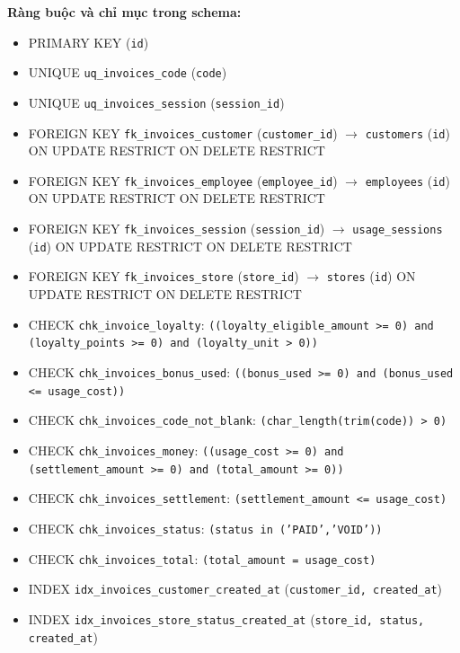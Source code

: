 \textbf{Ràng buộc và chỉ mục trong schema:}

\begin{itemize}

\item PRIMARY KEY (\texttt{id})

\item UNIQUE \texttt{uq\_invoices\_code} (\texttt{code})

\item UNIQUE \texttt{uq\_invoices\_session} (\texttt{session\_id})

\item FOREIGN KEY \texttt{fk\_invoices\_customer} (\texttt{customer\_id}) $\rightarrow$ \texttt{customers} (\texttt{id}) ON UPDATE RESTRICT ON DELETE RESTRICT

\item FOREIGN KEY \texttt{fk\_invoices\_employee} (\texttt{employee\_id}) $\rightarrow$ \texttt{employees} (\texttt{id}) ON UPDATE RESTRICT ON DELETE RESTRICT

\item FOREIGN KEY \texttt{fk\_invoices\_session} (\texttt{session\_id}) $\rightarrow$ \texttt{usage\_sessions} (\texttt{id}) ON UPDATE RESTRICT ON DELETE RESTRICT

\item FOREIGN KEY \texttt{fk\_invoices\_store} (\texttt{store\_id}) $\rightarrow$ \texttt{stores} (\texttt{id}) ON UPDATE RESTRICT ON DELETE RESTRICT

\item CHECK \texttt{chk\_invoice\_loyalty}: \texttt{((loyalty\_eligible\_amount >= 0) and (loyalty\_points >= 0) and (loyalty\_unit > 0))}

\item CHECK \texttt{chk\_invoices\_bonus\_used}: \texttt{((bonus\_used >= 0) and (bonus\_used <= usage\_cost))}

\item CHECK \texttt{chk\_invoices\_code\_not\_blank}: \texttt{(char\_length(trim(code)) > 0)}

\item CHECK \texttt{chk\_invoices\_money}: \texttt{((usage\_cost >= 0) and (settlement\_amount >= 0) and (total\_amount >= 0))}

\item CHECK \texttt{chk\_invoices\_settlement}: \texttt{(settlement\_amount <= usage\_cost)}

\item CHECK \texttt{chk\_invoices\_status}: \texttt{(status in ('PAID','VOID'))}

\item CHECK \texttt{chk\_invoices\_total}: \texttt{(total\_amount = usage\_cost)}

\item INDEX \texttt{idx\_invoices\_customer\_created\_at} (\texttt{customer\_id, created\_at})

\item INDEX \texttt{idx\_invoices\_store\_status\_created\_at} (\texttt{store\_id, status, created\_at})

\end{itemize}


